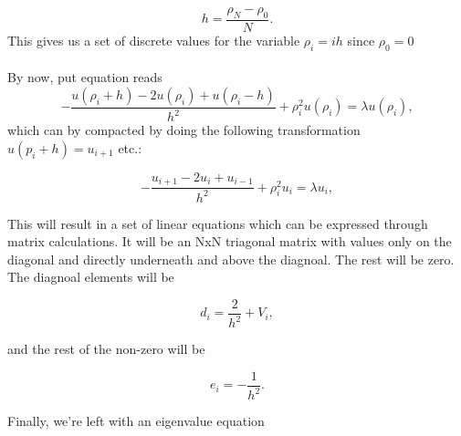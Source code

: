 \documentclass[12pt]{article}
\begin{document}
\begin{equation*}
  h=\frac{\rho_N-\rho_0 }{N}.
\end{equation*}
This gives us a set of discrete values for the variable $\rho_i = ih$ since $\rho_0 = 0$\\\\
By now, put equation reads
\begin{equation}
-\frac{u(\rho_i+h) -2u(\rho_i) +u(\rho_i-h)}{h^2}+\rho_i^2u(\rho_i)  = \lambda u(\rho_i),
\end{equation}
which can by compacted by doing the following transformation $u(p_i+h)=u_{i+1}$ etc.:

\begin{equation}
-\frac{u_{i+1} -2u_i +u_{i-1} }{h^2}+\rho_i^2u_i  = \lambda u_i,
\end{equation}

This will result in a set of linear equations which can be expressed through matrix calculations. It will be an NxN triagonal matrix with values only on the diagonal and directly underneath and above the diagnoal. The rest will be zero. The diagnoal elements will be

\begin{equation*}
   d_i=\frac{2}{h^2}+V_i,
\end{equation*}

and the rest of the non-zero will be

\begin{equation*}
   e_i=-\frac{1}{h^2}.
\end{equation*}

Finally, we're left with an eigenvalue equation
\end{document}
